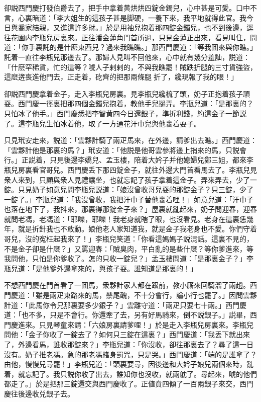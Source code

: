 卻説西門慶打發伯爵去了，把手中拿着黄烘烘四錠金鐲兒，心中甚是可愛。口中不言，心裏暗道：「李大姐生的這孩子甚是脚硬，一養下來，我平地就得此官。我今日與喬家結親，又進這許多財。」於是用袖兒抱着那四錠金鐲兒，也不到後邊，逕往花園内李瓶兒房裏來。正往潘金蓮角門首所過，只見金蓮正出來，看見叫住，問道：「你手裏託的是什麽東西兒？過來我瞧瞧。」那西門慶道：「等我囬來與你瞧。」託着一直往李瓶兒那邊去了。那婦人見叫不回他來，心中就有幾分羞訕，説道：「什麽罕稀貨，忙的這等？唬人子剌剌的，不與我瞧罷！賊跌折腿的三寸貨強盜，這麽逩喪進他門去，正走着，矻齊的把那兩條腿𢱉折了，纔現報了我的眼！」

卻説西門慶拿着金子，走入李瓶兒房裏。見李瓶兒纔梳了頭，奶子正抱着孩子頑耍。西門慶一徑裏把那四個金鐲兒抱着，教他手兒撾弄。李瓶兒道：「是那裏的？只怕冰了他手。」西門慶悉把李智黄四今日還銀子，準折利錢，約這金子一節説了。這李瓶兒生怕冰着他，取了一方通花汗巾兒與他裹着耍子。

只見玳安走來，説道：「雲夥計騎了兩疋馬來，在外邊，請爹出去瞧。」西門慶道：「雲夥計他是那裏的馬？」玳安道：「他説是他哥雲參將邊上捎來的馬，只説會行。」正説着，只見後邊李嬌兒、孟玉樓，陪着大妗子并他媳婦兒鄭三姐，都來李瓶兒房裏看官哥兒。西門慶丢下那四錠金子，就往外邊大門首看馬去了。李瓶兒見衆人來到，只顧與衆人見禮讓坐，也就忘記了孩子拿着這金子。弄來弄去，少了一錠。只見奶子如意兒問李瓶兒説道：「娘沒曾收哥兒耍的那錠金子？只三錠，少了一錠了。」李瓶兒道：「我沒曾收，我把汗巾子替他裹着哩！」如意兒道：「汗巾子也落在地下了，我抖來，那裏得那錠金子來？」屋裏就亂起來，奶子問迎春，迎春就問老馮，老馮道：「耶嚛，耶嚛！我老身就瞎了眼，也沒看見。老身在這裏恁幾年，就是折針我也不敢動。娘他老人家知道我，就是金子我老身也不愛。你們守着哥兒，沒的寃枉起我來了！」李瓶兒笑道：「你看這媽媽子説混話。這裏不見的，不是金子卻是什麽？」又罵迎春：「賊臭肉，平白亂的是些什麽？等你爹進來，等我問他，只怕是你爹收了。怎的只收一錠兒？」孟玉樓問道：「是那裏金子？」李瓶兒道：「是他爹外邊拿來的，與孩子耍。誰知道是那裏的！」

不想西門慶在門首看了一囬馬，衆夥計家人都在跟前，教小廝來回騎溜了兩趟。西門慶道：「雖是兩疋東路來的馬，鬃尾醜，不十分會行，論小行也罷了。」因問雲夥計道：「此馬你令兄那裏要多少銀子？」雲離守道：「兩疋只要七十兩。」西門慶道：「也不多，只是不會行。你還牽了去，另有好馬騎來，倒不説銀子。」説畢，西門慶進來。只見琴童來請：「六娘房裏請爹哩！」於是走入李瓶兒房裏來。李瓶兒問他：「金子你收了一錠去了？如何只三錠在這裏？」西門慶道：「我丢下就出來了，外邊看馬，誰收那錠來？」李瓶兒道：「你沒收，卻往那裏去了？尋了這一日沒有。奶子推老馮。急的那老馮賭身罰咒，只是哭。」西門慶道：「端的是誰拿了？由他，慢慢兒尋罷！」李瓶兒道：「頭裏要尋，因後邊和大妗子娘兒兩個來時，亂着，就忘記了。我只説你收了出去，誰知你也沒收，就兩躭了。尋起來，唬的他們都走了。」於是把那三錠還交與西門慶收了。正値賁四傾了一百兩銀子來交，西門慶往後邊收兑銀子去。

